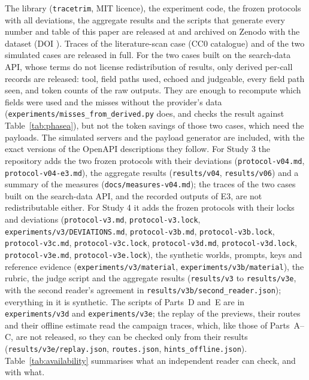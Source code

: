 The library (\texttt{tracetrim}, MIT licence), the experiment code, the frozen protocols with all deviations, the
aggregate results and the scripts that generate every number and table of this paper are released at
\RepositoryURL{} and archived on Zenodo with the dataset (DOI \SoftwareDOI). Traces of the literature-scan case (CC0 catalogue) and of the two
simulated cases are released in full. For the two cases built on the search-data API, whose terms do not license
redistribution of results, only derived per-call records are released: tool, field paths used, echoed and
judgeable, every field path seen, and token counts of the raw outputs. They are enough to recompute which fields
were used and the misses without the provider's data (\texttt{experiments/misses\_from\_derived.py} does, and checks
the result against Table~\ref{tab:phasea}), but not the token savings of those two cases, which need the payloads. The simulated servers
and the payload generator are included, with the exact versions of the OpenAPI descriptions they follow. For
Study 3 the repository adds the two frozen protocols with their deviations (\texttt{protocol-v04.md},
\texttt{protocol-v04-e3.md}), the aggregate results (\texttt{results/v04}, \texttt{results/v06}) and a summary of the
measures (\texttt{docs/measures-v04.md}); the traces of the two cases built on the search-data API, and the recorded
outputs of E3, are not redistributable either. For Study 4 it adds the frozen protocols with their locks and
deviations (\nolinkurl{protocol-v3.md}, \nolinkurl{protocol-v3.lock}, \nolinkurl{experiments/v3/DEVIATIONS.md},
\nolinkurl{protocol-v3b.md}, \nolinkurl{protocol-v3b.lock}, \nolinkurl{protocol-v3c.md}, \nolinkurl{protocol-v3c.lock},
\nolinkurl{protocol-v3d.md}, \nolinkurl{protocol-v3d.lock}, \nolinkurl{protocol-v3e.md}, \nolinkurl{protocol-v3e.lock}), the synthetic worlds, prompts, keys and reference evidence
(\nolinkurl{experiments/v3/material}, \nolinkurl{experiments/v3b/material}), the rubric, the judge script and the aggregate
results (\nolinkurl{results/v3} to \nolinkurl{results/v3e}, with the second reader's agreement
in \nolinkurl{results/v3b/second_reader.json}); everything in it is synthetic. The scripts of Parts~D and~E are in
\nolinkurl{experiments/v3d} and \nolinkurl{experiments/v3e}; the replay of the previews, their routes and their
offline estimate read the campaign traces, which, like those of Parts~A--C, are not released, so they can be
checked only from their results (\nolinkurl{results/v3e/replay.json}, \nolinkurl{routes.json},
\nolinkurl{hints_offline.json}). Table~\ref{tab:availability} summarises what an independent reader can check, and with what.


